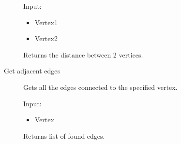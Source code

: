 \begin{description}
	Input:
	\begin{itemize}
		\item Vertex1
		\item Vertex2
	\end{itemize}
	Returns the distance between 2 vertices.
	\item[Get adjacent edges] 
	Gets all the edges connected to the specified vertex.

	Input:
	\begin{itemize}
		\item Vertex
	\end{itemize}
	Returns list of found edges.
\end{description}


